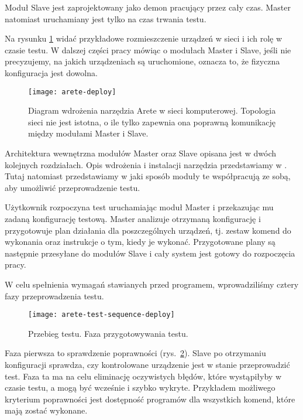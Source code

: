 \documentclass[00-praca-magisterska.tex]{subfiles}
\begin{document}
Moduł Slave jest zaprojektowany jako demon pracujący przez cały czas. Master
natomiast uruchamiany jest tylko na czas trwania testu.

Na rysunku \ref{fig:arete-deploy} widać przykładowe rozmieszczenie urządzeń w
sieci i ich rolę w czasie testu. W dalszej części pracy mówiąc o modułach
Master i Slave, jeśli nie precyzujemy, na jakich urządzeniach są uruchomione,
oznacza to, że fizyczna konfiguracja jest dowolna.

\begin{figure}
\begin{center}
\leavevmode
\texttt{[image: arete-deploy]}
\end{center}
\caption{Diagram wdrożenia narzędzia Arete w sieci komputerowej. Topologia
sieci nie jest istotna, o ile tylko zapewnia ona poprawną komunikację między
modułami Master i Slave.}
\label{fig:arete-deploy}
\end{figure}

Architektura wewnętrzna modułów Master oraz Slave opisana jest w dwóch
kolejnych rozdziałach. Opis wdrożenia i instalacji narzędzia przedstawiamy w
. Tutaj natomiast przedstawiamy w jaki sposób
moduły te współpracują ze sobą, aby umożliwić przeprowadzenie testu.

Użytkownik rozpoczyna test uruchamiając moduł Master i przekazując mu zadaną
konfigurację testową. Master analizuje otrzymaną konfigurację i przygotowuje
plan działania dla poszczególnych urządzeń, tj. zestaw komend do wykonania oraz
instrukcje o tym, kiedy je wykonać. Przygotowane plany są następnie przesyłane
do modułów Slave i cały system jest gotowy do rozpoczęcia pracy.

W celu spełnienia wymagań stawianych przed programem, wprowadziliśmy cztery
fazy przeprowadzenia testu.

\begin{figure}
\begin{center}
\leavevmode
\texttt{[image: arete-test-sequence-deploy]}
\end{center}
\caption{Przebieg testu. Faza przygotowywania testu.}
\label{fig:arete-test-seq-deploy}
\end{figure}

Faza pierwsza to sprawdzenie poprawności (rys.~\ref{fig:arete-test-seq-deploy}).
Slave po otrzymaniu konfiguracji sprawdza, czy kontrolowane urządzenie jest w
stanie przeprowadzić test. Faza ta ma na celu eliminację oczywistych błędów,
które wystąpiłyby w czasie testu, a mogą być wcześnie i szybko wykryte.
Przykładem możliwego kryterium poprawności jest dostępność programów dla
wszystkich komend, które mają zostać wykonane.
\end{document}
